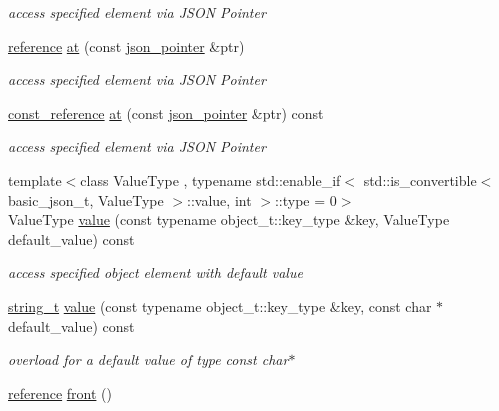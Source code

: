 \begin{DoxyCompactItemize}
\begin{DoxyCompactList}\small\item\em access specified element via J\-S\-O\-N Pointer \end{DoxyCompactList}\item 
\hyperlink{classnlohmann_1_1basic__json_a3ec8e17be8732fe436e9d6733f52b7a3}{reference} \hyperlink{classnlohmann_1_1basic__json_a649aef71e5d952499da7ad3b8e7c9236}{at} (const \hyperlink{classnlohmann_1_1basic__json_1_1json__pointer}{json\-\_\-pointer} \&ptr)
\begin{DoxyCompactList}\small\item\em access specified element via J\-S\-O\-N Pointer \end{DoxyCompactList}\item 
\hyperlink{classnlohmann_1_1basic__json_af677a29b0e66edc9f66e5167e4667071}{const\-\_\-reference} \hyperlink{classnlohmann_1_1basic__json_a0d46dd5ef4992fb80f9f0d9f56f16eae}{at} (const \hyperlink{classnlohmann_1_1basic__json_1_1json__pointer}{json\-\_\-pointer} \&ptr) const 
\begin{DoxyCompactList}\small\item\em access specified element via J\-S\-O\-N Pointer \end{DoxyCompactList}\item 
{\footnotesize template$<$class Value\-Type , typename std\-::enable\-\_\-if$<$ std\-::is\-\_\-convertible$<$ basic\-\_\-json\-\_\-t, Value\-Type $>$\-::value, int $>$\-::type  = 0$>$ }\\Value\-Type \hyperlink{classnlohmann_1_1basic__json_a0a2cbbd95862a623e7dc5c37e67dead0}{value} (const typename object\-\_\-t\-::key\-\_\-type \&key, Value\-Type default\-\_\-value) const 
\begin{DoxyCompactList}\small\item\em access specified object element with default value \end{DoxyCompactList}\item 
\hyperlink{classnlohmann_1_1basic__json_ab63e618bbb0371042b1bec17f5891f42}{string\-\_\-t} \hyperlink{classnlohmann_1_1basic__json_af071057ebab57744f5767eb369e99d42}{value} (const typename object\-\_\-t\-::key\-\_\-type \&key, const char $\ast$default\-\_\-value) const 
\begin{DoxyCompactList}\small\item\em overload for a default value of type const char$\ast$ \end{DoxyCompactList}\item 
\hyperlink{classnlohmann_1_1basic__json_a3ec8e17be8732fe436e9d6733f52b7a3}{reference} \hyperlink{classnlohmann_1_1basic__json_aa45753034bea87f9d2c0c42ace9ff75c}{front} ()

\end{DoxyCompactItemize}
